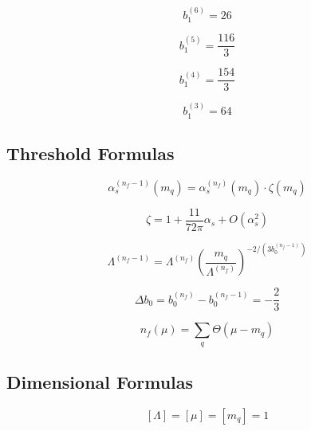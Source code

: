 \documentclass[11pt,a4paper]{article}
\theoremstyle{definition}
\begin{document}
\begin{equation}
\label{eq:cat-17}
b_1^{(6)} = 26
\end{equation}

\begin{equation}
\label{eq:cat-18}
b_1^{(5)} = \frac{116}{3}
\end{equation}

\begin{equation}
\label{eq:cat-19}
b_1^{(4)} = \frac{154}{3}
\end{equation}

\begin{equation}
\label{eq:cat-20}
b_1^{(3)} = 64
\end{equation}

\subsection{Threshold Formulas}
\label{subsec:cat-threshold}

\begin{equation}
\label{eq:cat-21}
\alpha_s^{(n_f-1)}(m_q) = \alpha_s^{(n_f)}(m_q) \cdot \zeta(m_q)
\end{equation}

\begin{equation}
\label{eq:cat-22}
\zeta = 1 + \frac{11}{72\pi}\alpha_s + O(\alpha_s^2)
\end{equation}

\begin{equation}
\label{eq:cat-23}
\Lambda^{(n_f-1)} = \Lambda^{(n_f)}\left(\frac{m_q}{\Lambda^{(n_f)}}\right)^{-2/(3b_0^{(n_f-1)})}
\end{equation}

\begin{equation}
\label{eq:cat-24}
\Delta b_0 = b_0^{(n_f)} - b_0^{(n_f-1)} = -\frac{2}{3}
\end{equation}

\begin{equation}
\label{eq:cat-25}
n_f(\mu) = \sum_q \Theta(\mu - m_q)
\end{equation}

\subsection{Dimensional Formulas}
\label{subsec:cat-dim}

\begin{equation}
\label{eq:cat-26}
[\Lambda] = [\mu] = [m_q] = 1
\end{equation}
\end{document}
